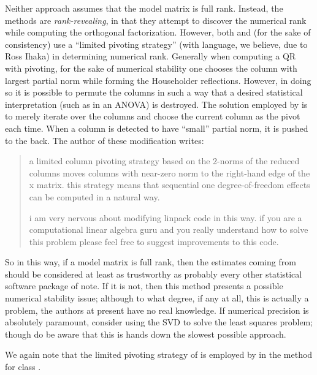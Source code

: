 Neither approach assumes that the model matrix is full rank.  Instead, the methods are \emph{rank-revealing}, in that they attempt to discover the numerical rank while computing the orthogonal factorization.  However, both  and (for the sake of consistency)
 use a ``limited pivoting strategy'' (with language, we believe, due to Ross Ihaka) in determining numerical rank.  Generally when computing a QR with pivoting, for the sake of numerical stability one chooses the column with largest partial norm while forming the Householder reflections.  However, in doing so it is possible to permute the columns in such a way that a desired statistical interpretation (such as in an ANOVA) is destroyed.  The solution employed by  is to merely iterate over the columns and choose the current column as the pivot each time.  When a column is detected to have ``small'' partial norm, it is pushed to the back.  The author of these modification writes:
\begin{quote}
     a limited column pivoting strategy based on the 2-norms 
     of the reduced columns moves columns with near-zero norm to the 
     right-hand edge of the x matrix.  this strategy means that 
     sequential one degree-of-freedom effects can be computed in a 
     natural way.

     i am very nervous about modifying linpack code in this way.
     if you are a computational linear algebra guru and you really
     understand how to solve this problem please feel free to
     suggest improvements to this code.
\end{quote}
So in this way, if a model matrix is full rank, then the estimates coming from  should be considered at least as trustworthy as probably every other statistical software package of note.  If it is not, then this method presents a possible numerical stability issue; although to what degree, if any at all, this is actually a problem, the authors at present have no real knowledge.  If numerical precision is absolutely paramount, consider using the SVD to solve the least squares problem; though do be aware that this is hands down the slowest possible approach.

We again note that the limited pivoting strategy of  is employed by
 in the  method for
class .
